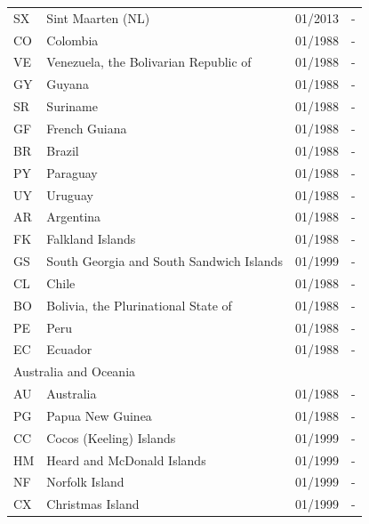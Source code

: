 \begin{small}
\begin{longtable}{p{0.5cm}p{9cm}p{2cm}p{2cm}}
SX	&	Sint Maarten (NL)	&	01/2013	&	-	\\

CO	&	Colombia	&	01/1988	&	-	\\

VE	&	Venezuela, the Bolivarian Republic of	&	01/1988	&	-	\\

GY	&	Guyana	&	01/1988	&	-	\\

SR	&	Suriname	&	01/1988	&	-	\\

GF	&	French Guiana	&	01/1988	&	-	\\

BR	&	Brazil	&	01/1988	&	-	\\

PY	&	Paraguay	&	01/1988	&	-	\\

UY	&	Uruguay	&	01/1988	&	-	\\

AR	&	Argentina	&	01/1988	&	-	\\

FK	&	Falkland Islands	&	01/1988	&	-	\\

GS	&	South Georgia and South Sandwich Islands	&	01/1999	&	-	\\

CL	&	Chile	&	01/1988	&	-	\\

BO	&	Bolivia, the Plurinational State of	&	01/1988	&	-	\\

PE	&	Peru	&	01/1988	&	-	\\

EC	&	Ecuador	&	01/1988	&	-	\\

\midrule
\multicolumn{3}{l}{Australia and Oceania}	&	\\
AU	&	Australia	&	01/1988	&	-	\\

PG	&	Papua New Guinea	&	01/1988	&	-	\\

CC	&	Cocos (Keeling) Islands	&	01/1999	&	-	\\

HM	&	Heard and McDonald Islands	&	01/1999	&	-	\\

NF	&	Norfolk Island	&	01/1999	&	-	\\

CX	&	Christmas Island	&	01/1999	&	-	\\


\end{longtable}
\end{small}

